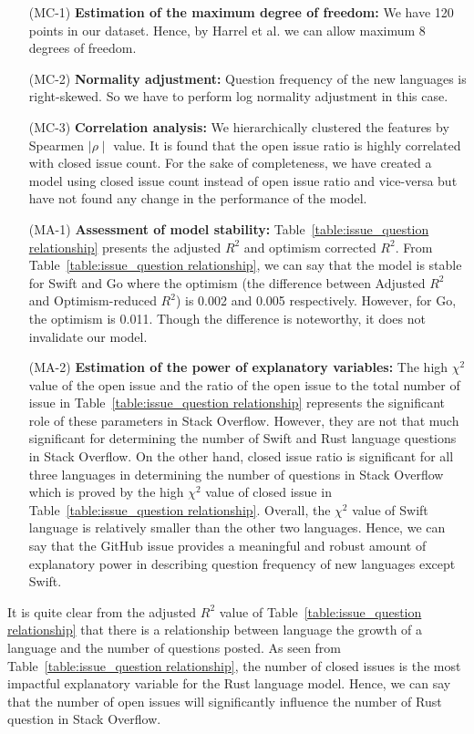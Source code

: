 
\begin{enumerate}[wide=0pt, leftmargin=*]
    \item[(MC-1)] \textbf{Estimation of the maximum degree of freedom:} We have 120  points in our dataset. Hence, by Harrel et al.\citep{Harrell2015} we can allow maximum 8 degrees of freedom.
    \item[(MC-2)] \textbf{Normality adjustment:} Question frequency of the new languages is right-skewed. So we have to perform log normality adjustment in this case.
    \item[(MC-3)] \textbf{Correlation analysis:}
    We hierarchically clustered the features by Spearmen $\mid \rho \mid$ value. It is found that the open issue ratio is highly correlated with closed issue count. For the sake of completeness, we have created a model using closed issue count instead of open issue ratio and vice-versa but have not found any change in the performance of the model.
    \item[(MA-1)] \textbf{Assessment of model stability:}
    Table~\ref{table:issue_question relationship} presents the adjusted $R^2$ and optimism corrected $R^2$. From Table~\ref{table:issue_question relationship}, we can say that the model is stable for Swift and Go where the optimism (the difference between Adjusted $R^2$ and Optimism-reduced $R^2$) is 0.002 and 0.005 respectively. However, for Go, the optimism is 0.011. Though the difference is noteworthy, it does not invalidate our model.
    \item[(MA-2)] \textbf{Estimation of the power of explanatory variables:}
    The high $\chi^2$ value of the open issue and the ratio of the open issue to the total number of issue in  Table~\ref{table:issue_question relationship} represents the significant role of these parameters in Stack Overflow. However, they are not that much significant for determining the number of Swift and Rust language questions in Stack Overflow. On the other hand, closed issue ratio is significant for all three languages in determining the number of questions in Stack Overflow which is proved by the high $\chi^2$  value of closed issue in Table~\ref{table:issue_question relationship}. Overall,  the $\chi^2$ value of Swift language is relatively smaller than the other two languages. Hence, we can say that the GitHub issue provides a meaningful and robust amount of explanatory power in describing question frequency of new languages except Swift.
\end{enumerate}
It is quite clear from the adjusted $R^2$ value of Table~\ref{table:issue_question relationship} that there is a relationship between language the growth of a language and the number of questions posted. As seen from Table~\ref{table:issue_question relationship}, the number of closed issues is the most impactful explanatory variable for the Rust language model. Hence, we can say that the number of open issues will significantly influence the number of Rust question in Stack Overflow.
